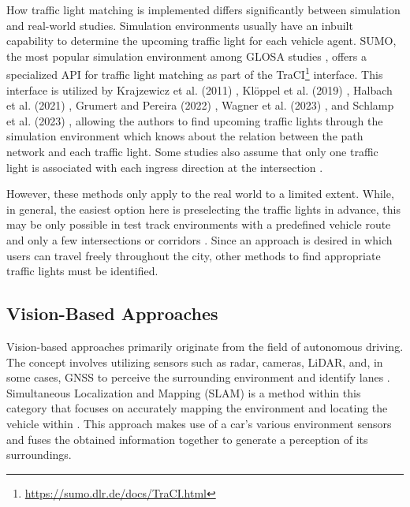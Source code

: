 How traffic light matching is implemented differs significantly between simulation and real-world studies. Simulation environments usually have an inbuilt capability to determine the upcoming traffic light for each vehicle agent. SUMO, the most popular simulation environment among GLOSA studies \cite{krajzewicz_preparing_2012, erdmann_combining_2013, eckhoff_potentials_2013, tal_vehicular-communications-based_2016, nguyen_efficient_2016, olaverri-monreal_implementation_2018, karoui_efficiency_2018, pariota_green_2019, kloeppel_performance_2019, lu_green_2020, halbach_cooperative_2021, bhattacharyya_assessing_2022, grumert_heads-up_2022, wagner_spatmap_2023}, offers a specialized API for traffic light matching as part of the TraCI\footnote{\url{https://sumo.dlr.de/docs/TraCI.html}} interface. This interface is utilized by Krajzewicz et al. (2011) \cite{krajzewicz_preparing_2012}, Klöppel et al. (2019) \cite{kloeppel_performance_2019}, Halbach et al. (2021) \cite{halbach_cooperative_2021}, Grumert and Pereira (2022) \cite{grumert_heads-up_2022}, Wagner et al. (2023) \cite{wagner_spatmap_2023}, and Schlamp et al. (2023) \cite{schlamp_2023_glosa}, allowing the authors to find upcoming traffic lights through the simulation environment which knows about the relation between the path network and each traffic light. Some studies also assume that only one traffic light is associated with each ingress direction at the intersection \cite{xia_indirect_2011, li_multi-vehicles_2014, plianos_predictive_2018}.

However, these methods only apply to the real world to a limited extent. While, in general, the easiest option here is preselecting the traffic lights in advance, this may be only possible in test track environments with a predefined vehicle route and only a few intersections \cite{chen_developing_2022} or corridors \cite{fickas_fast_2019}. Since an approach is desired in which users can travel freely throughout the city, other methods to find appropriate traffic lights must be identified.

\subsection{Vision-Based Approaches}

Vision-based approaches primarily originate from the field of autonomous driving. The concept involves utilizing sensors such as radar, cameras, LiDAR, and, in some cases, GNSS to perceive the surrounding environment and identify lanes \cite{lee_avm_2017, sadli_map-matching-based_2022}. Simultaneous Localization and Mapping (SLAM) is a method within this category that focuses on accurately mapping the environment and locating the vehicle within \cite{cheng_review_2022}. This approach makes use of a car's various environment sensors and fuses the obtained information together to generate a perception of its surroundings. 

